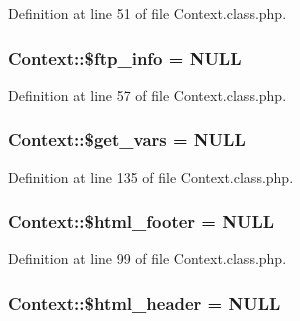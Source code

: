 Definition at line 51 of file Context.\+class.\+php.

\subsubsection[{\texorpdfstring{\$ftp\+\_\+info}{$ftp_info}}]{\setlength{\rightskip}{0pt plus 5cm}Context\+::\$ftp\+\_\+info = N\+U\+LL}\hypertarget{classContext_a8b9cb334c451f773d75db73b01f86ccc}{}\label{classContext_a8b9cb334c451f773d75db73b01f86ccc}


Definition at line 57 of file Context.\+class.\+php.

\subsubsection[{\texorpdfstring{\$get\+\_\+vars}{$get_vars}}]{\setlength{\rightskip}{0pt plus 5cm}Context\+::\$get\+\_\+vars = N\+U\+LL}\hypertarget{classContext_a587652913f4784dc8ad4a1cd4e3ee408}{}\label{classContext_a587652913f4784dc8ad4a1cd4e3ee408}


Definition at line 135 of file Context.\+class.\+php.

\subsubsection[{\texorpdfstring{\$html\+\_\+footer}{$html_footer}}]{\setlength{\rightskip}{0pt plus 5cm}Context\+::\$html\+\_\+footer = N\+U\+LL}\hypertarget{classContext_ad55e79b648659c59512e02a6c0d349ff}{}\label{classContext_ad55e79b648659c59512e02a6c0d349ff}


Definition at line 99 of file Context.\+class.\+php.

\subsubsection[{\texorpdfstring{\$html\+\_\+header}{$html_header}}]{\setlength{\rightskip}{0pt plus 5cm}Context\+::\$html\+\_\+header = N\+U\+LL}\hypertarget{classContext_ab0146079ffcc658bbe5bbf4ba7b8e934}{}\label{classContext_ab0146079ffcc658bbe5bbf4ba7b8e934}


